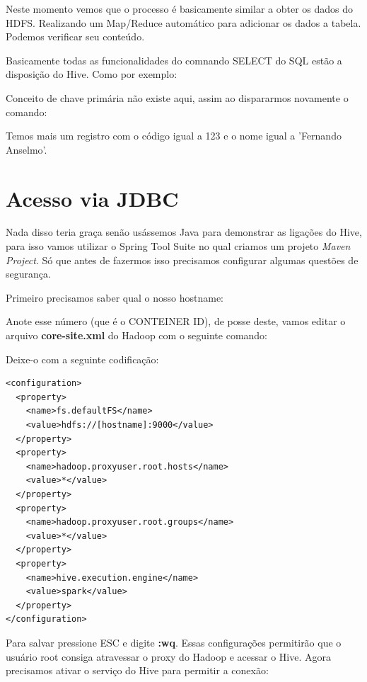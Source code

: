 \documentclass[a4paper,11pt]{article}
\begin{document}
Neste momento vemos que o processo é basicamente similar a obter os dados do HDFS. Realizando um Map/Reduce automático para adicionar os dados a tabela. Podemos verificar seu conteúdo. \\

Basicamente todas as funcionalidades do comnando SELECT do SQL estão a disposição do Hive. Como por exemplo: \\

Conceito de chave primária não existe aqui, assim ao dispararmos novamente o comando: \\

Temos mais um registro com o código igual a 123 e o nome igual a 'Fernando Anselmo'.

\section{Acesso via JDBC}
Nada disso teria graça senão usássemos Java para demonstrar as ligações do Hive, para isso vamos utilizar o Spring Tool Suite no qual criamos um projeto \textit{Maven Project}. Só que antes de fazermos isso precisamos configurar algumas questões de segurança.

Primeiro precisamos saber qual o nosso hostname: \\

Anote esse número (que é o CONTEINER ID), de posse deste, vamos editar o arquivo \textbf{core-site.xml} do Hadoop com o seguinte comando: \\

Deixe-o com a seguinte codificação:
\begin{lstlisting}[]
<configuration>
  <property>
    <name>fs.defaultFS</name>
    <value>hdfs://[hostname]:9000</value>
  </property>
  <property>
    <name>hadoop.proxyuser.root.hosts</name>
    <value>*</value>
  </property>
  <property>
    <name>hadoop.proxyuser.root.groups</name>
    <value>*</value>
  </property>
  <property>
    <name>hive.execution.engine</name>
    <value>spark</value>
  </property>  
</configuration>
\end{lstlisting}

Para salvar pressione ESC e digite \textbf{:wq}. Essas configurações permitirão que o usuário root consiga atravessar o proxy do Hadoop e acessar o Hive. Agora precisamos ativar o serviço do Hive para permitir a conexão: \\
\end{document}
